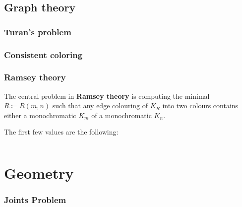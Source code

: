 \documentclass[12pt]{amsart}
\theoremstyle{definition}
\newcommand{\FF}{\mathcal F}
\newcommand{\vv}{\mathsf{v}}
\newcommand{\vx}{\mathsf{x}}
\begin{document}
%
%

\subsection{Graph theory}

\subsubsection{Turan's problem}

\subsubsection{Consistent coloring}

\subsubsection{Ramsey theory}
The central problem in \textbf{Ramsey theory} is computing the minimal $R \coloneqq R(m, n)$ such that any edge colouring of $K_R$ into two colours contains either a monochromatic $K_m$ of a monochromatic $K_n$.


The first few values are the following:

\begin{tabular}{l| }

\end{tabular}




\section{Geometry}

\subsubsection*{Joints Problem}
\end{document}
